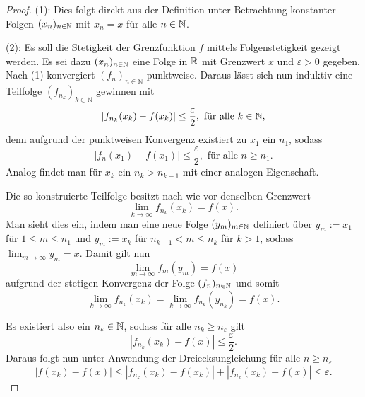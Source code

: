 \begin{proof}
  (1): 
  Dies folgt direkt aus der Definition unter Betrachtung konstanter Folgen $(x_n)_{n \in \mathbb{N}}$ mit $x_n = x$ für alle $n \in \mathbb{N}$.

  (2): 
  Es soll die Stetigkeit der Grenzfunktion $f$ mittels Folgenstetigkeit gezeigt werden. 
  Es sei dazu $(x_n)_{n \in \mathbb{N}}$ eine Folge in $\mathbb{R}$ mit Grenzwert $x$ und $\varepsilon > 0$ gegeben.
  Nach (1) konvergiert $(f_n)_{n \in \mathbb{N}}$ punktweise.
  Daraus lässt sich nun induktiv eine Teilfolge $(f_{n_k})_{k \in \mathbb{N}}$ gewinnen mit
  \begin{displaymath}
    | f_{n_k}(x_k) - f(x_k) | \leq \frac{\varepsilon}{2}, \text{ für alle $k \in \mathbb{N}$},
  \end{displaymath}
  denn aufgrund der punktweisen Konvergenz existiert zu $x_1$ ein $n_1$, sodass
  \begin{displaymath}
    | f_{n}(x_1) - f(x_1) | \leq \frac{\varepsilon}{2}, \text{ für alle $n \geq n_1$}.
  \end{displaymath}
  Analog findet man für $x_k$ ein $n_k > n_{k-1}$ mit einer analogen Eigenschaft.

  Die so konstruierte Teilfolge besitzt nach wie vor denselben Grenzwert
  \begin{displaymath}
    \lim_{k \to \infty} f_{n_k}(x_k) = f(x).
  \end{displaymath}
  Man sieht dies ein, indem man eine neue Folge $(y_m)_{m \in \mathbb{N}}$ definiert über $y_m:=x_1$ für $1 \leq m \leq n_1$ und $y_m:=x_k$ für $n_{k-1} < m \leq n_{k}$ für $k > 1$, sodass $\lim_{m \to \infty} y_m = x$.
  Damit gilt nun
  \begin{displaymath}
    \lim_{m \to \infty} f_m(y_m) = f(x)
  \end{displaymath}
  aufgrund der stetigen Konvergenz der Folge $(f_n)_{n \in \mathbb{N}}$ und somit
  \begin{displaymath}
    \lim_{k \to \infty} f_{n_k}(x_{k}) 
    = \lim_{k \to \infty} f_{n_k}(y_{n_k}) 
    = f(x).
  \end{displaymath} 

  Es existiert also ein $n_\varepsilon \in \mathbb{N}$, sodass für alle $n_k \geq n_\varepsilon$ gilt
  \begin{displaymath}
    | f_{n_k}(x_k) - f(x) | \leq \frac{\varepsilon}{2}.
  \end{displaymath}
  Daraus folgt nun unter Anwendung der Dreiecksungleichung für alle $n \geq n_\varepsilon$
  \begin{displaymath}
    | f(x_k) - f(x) |
    \leq
    | f_{n_k}(x_k) - f(x_k) | + | f_{n_k}(x_k) - f(x) | 
    \leq \varepsilon.
  \end{displaymath}


\end{proof}
